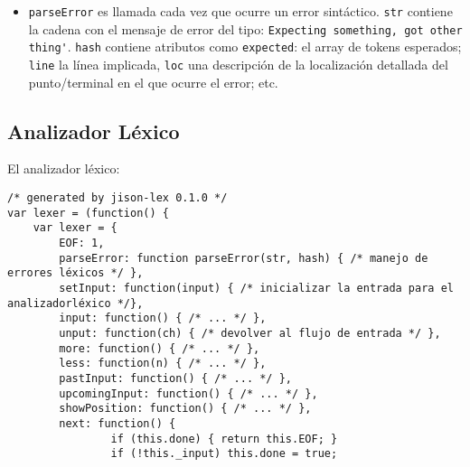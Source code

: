 \begin{itemize}
\item
\verb|parseError| es llamada cada vez que ocurre un error sintáctico.
\verb|str| contiene la cadena con el mensaje de error del tipo: 
\verb|Expecting something, got other thing'|.
\verb|hash| contiene atributos como \verb|expected|: el array de tokens esperados; 
\verb|line| la línea implicada, \verb|loc| una descripción de la localización detallada del punto/terminal
en el que ocurre el error; etc.
\end{itemize}


\subsection{Analizador Léxico}
El analizador léxico:
\begin{verbatim}
/* generated by jison-lex 0.1.0 */
var lexer = (function() {
    var lexer = {
        EOF: 1,
        parseError: function parseError(str, hash) { /* manejo de errores léxicos */ },
        setInput: function(input) { /* inicializar la entrada para el analizadorléxico */},
        input: function() { /* ... */ },
        unput: function(ch) { /* devolver al flujo de entrada */ },
        more: function() { /* ... */ },
        less: function(n) { /* ... */ },
        pastInput: function() { /* ... */ },
        upcomingInput: function() { /* ... */ },
        showPosition: function() { /* ... */ },
        next: function() {
                if (this.done) { return this.EOF; }
                if (!this._input) this.done = true;


\end{verbatim}

